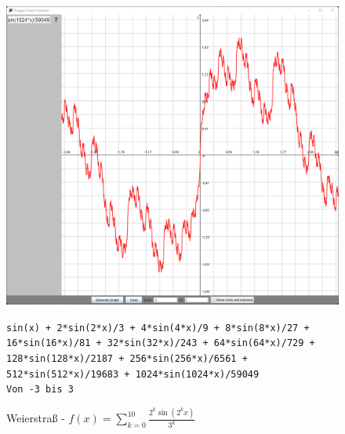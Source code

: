 \documentclass[12pt]{article}
\begin{document}
	\begin{figure}[!ht]
		\begin{center}
		\includegraphics[scale=0.5]{images/sample5.png}
		\end{center}
		\caption{Weierstraß - $f(x) = \sum_{k=0}^{10} \frac{2^k \sin(2^k x)}{3^k}$}

		\begin{center}
			\texttt{sin(x) + 2*sin(2*x)/3 + 4*sin(4*x)/9 + 8*sin(8*x)/27 + 16*sin(16*x)/81 + 32*sin(32*x)/243 + 64*sin(64*x)/729 + 128*sin(128*x)/2187 + 256*sin(256*x)/6561 + 512*sin(512*x)/19683 + 1024*sin(1024*x)/59049} \\
			\texttt{Von -3 bis 3}
		\end{center}
	\end{figure}
\end{document}
